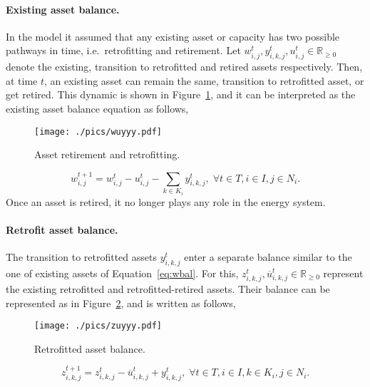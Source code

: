 \documentclass{amsart}
\begin{document}
\paragraph{Existing asset balance.}
%
In the model it assumed that any existing asset or capacity has two possible
pathways in time, i.e.\ retrofitting and retirement. Let $w^t_{i,j},
y^t_{i,k,j},u^{t}_{i,j}\in\mathbb{R}_{\geq 0}$ denote the existing, transition
to retrofitted and retired assets respectively. Then, at time $t$, an existing
asset can remain the same, transition to retrofitted asset, or get retired. This
dynamic is shown in Figure~\ref{fig:wuyyy}, and it can be interpreted as the
existing asset balance equation as follows,
\begin{figure}[ht]
    \centering
    \texttt{[image: ./pics/wuyyy.pdf]}
    \caption{Asset retirement and retrofitting.\label{fig:wuyyy}}
\end{figure}
%
\begin{equation}
  w^{t+1}_{i,j} = w^{t}_{i,j} - u^{t}_{i,j} - \sum_{k \in K_i} y^{t}_{i, k,j}, 
  \; \forall t \in T, i \in I, j \in N_i.
\label{eq:wbal}
\end{equation}
%
Once an asset is retired, it no longer plays any role in the energy system. 
%
\paragraph{Retrofit asset balance.}
%
The transition to retrofitted assets $y^t_{i,k,j}$ enter a separate balance
similar to the one of existing assets of Equation~\eqref{eq:wbal}. For this,
$z^t_{i,k,j}, \overline{u}^t_{i,k,j}\in\mathbb{R}_{\geq 0}$ represent the
existing retrofitted and retrofitted-retired assets. Their balance can be
represented as in Figure~\ref{fig:zuyy}, and is written as follows,
%
\begin{figure}[ht]
   \centering
   \texttt{[image: ./pics/zuyyy.pdf]} 
   \caption{Retrofitted asset balance.} 
\label{fig:zuyy} 
\end{figure}
%
\begin{equation}
    z^{t+1}_{i,k,j} = z^{t}_{i,k,j} - \overline{u}^t_{i,k,j} + y^t_{i,k,j},\;
    \forall 
  t \in T, i \in I, k \in K_i, j \in N_i.
\label{eq:zeqzrf}
\end{equation}
%
%
\end{document}

